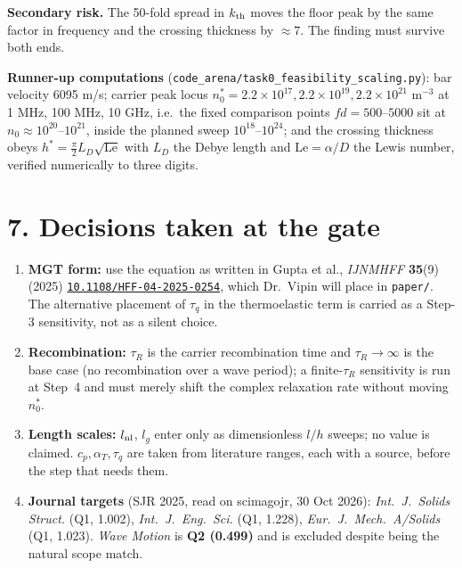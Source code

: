 \documentclass[11pt]{article}
\newcommand{\doi}[1]{\href{https://doi.org/#1}{\texttt{#1}}}
\begin{document}
\textbf{Secondary risk.} The 50-fold spread in $k_{\rm th}$ moves the floor peak by the same factor
in frequency and the crossing thickness by $\approx7$. The finding must survive both ends.

\textbf{Runner-up computations} (\texttt{code\_arena/task0\_feasibility\_scaling.py}): bar velocity
6095 m/s; carrier peak locus $n_0^{*}=2.2\times10^{17},2.2\times10^{19},2.2\times10^{21}$ m$^{-3}$ at
1 MHz, 100 MHz, 10 GHz, i.e.\ the fixed comparison points $fd=500$--$5000$ sit at
$n_0\approx10^{20}$--$10^{21}$, inside the planned sweep $10^{18}$--$10^{24}$; and the crossing
thickness obeys $h^{*}=\tfrac{\pi}{2}L_D\sqrt{\mathrm{Le}}$ with $L_D$ the Debye length and
$\mathrm{Le}=\alpha/D$ the Lewis number, verified numerically to three digits.

\section*{7. Decisions taken at the gate}
\begin{enumerate}\small
\item \textbf{MGT form:} use the equation as written in Gupta et al., \emph{IJNMHFF} \textbf{35}(9)
(2025) \doi{10.1108/HFF-04-2025-0254}, which Dr.\ Vipin will place in \texttt{paper/}. The
alternative placement of $\tau_q$ in the thermoelastic term is carried as a Step-3 sensitivity,
not as a silent choice.
\item \textbf{Recombination:} $\tau_R$ is the carrier recombination time and $\tau_R\to\infty$ is the
base case (no recombination over a wave period); a finite-$\tau_R$ sensitivity is run at Step~4 and
must merely shift the complex relaxation rate without moving $n_0^{*}$.
\item \textbf{Length scales:} $l_{\rm nl}$, $l_g$ enter only as dimensionless $l/h$ sweeps; no value
is claimed. $c_p,\alpha_T,\tau_q$ are taken from literature ranges, each with a source, before the
step that needs them.
\item \textbf{Journal targets} (SJR 2025, read on scimagojr, 30 Oct 2026):
\emph{Int.\ J.\ Solids Struct.} (Q1, 1.002), \emph{Int.\ J.\ Eng.\ Sci.} (Q1, 1.228),
\emph{Eur.\ J.\ Mech.\ A/Solids} (Q1, 1.023). \emph{Wave Motion} is \textbf{Q2 (0.499)} and is
excluded despite being the natural scope match.
\end{enumerate}
\end{document}
